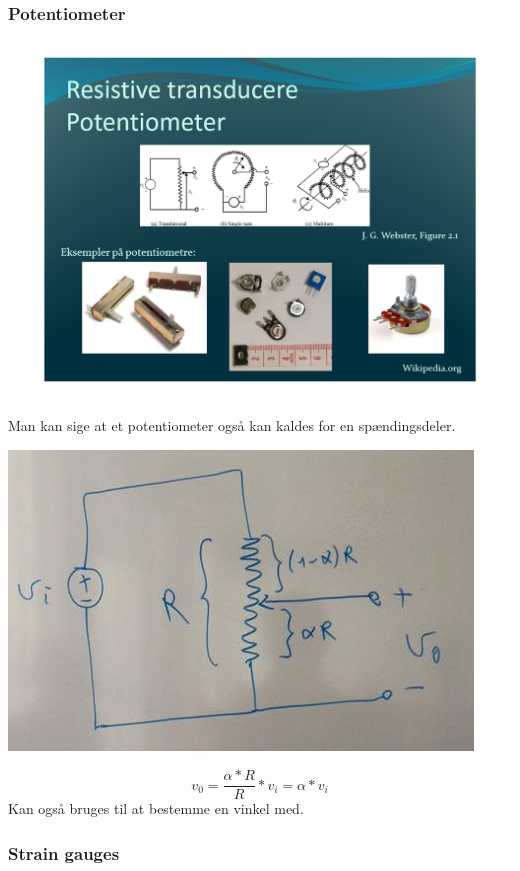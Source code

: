 \documentclass[12pt, letterpaper]{article}
\begin{document}
\subsubsection{Potentiometer}
\begin{center}
\includegraphics[width=\textwidth]{billeder/billede28}
\end{center}
Man kan sige at et potentiometer også kan kaldes for en spændingsdeler.

\begin{center}
\includegraphics[width=\textwidth]{billeder/billede31}
\end{center}
$$v_0=\frac{\alpha*R}{R}*v_i = \alpha*v_i$$
Kan også bruges til at bestemme en vinkel med.






\newpage
\subsubsection{Strain gauges}
\end{document}
